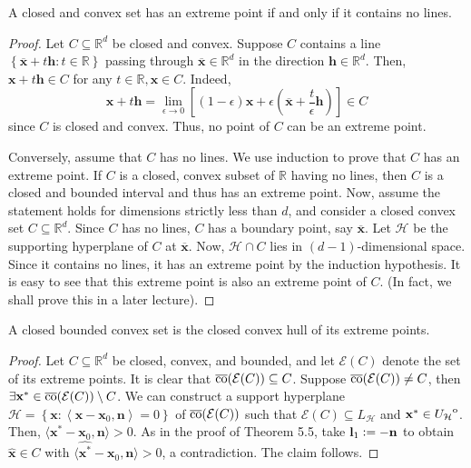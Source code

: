 \begin{thm}
    A closed and convex set has an extreme point if and only if it contains no lines. 
\end{thm}
\begin{proof}
    Let $C \subseteq \mathbb{R}^d$ be closed and convex. Suppose $C$ contains a line $\left\{ \overline{\mathbf{x}} + t\mathbf{h} \colon t \in \mathbb{R} \right\}$ passing through $\overline{\mathbf{x}} \in \mathbb{R}^d$ in the direction $\mathbf{h} \in \mathbb{R}^d$. Then, $\mathbf{x} + t\mathbf{h} \in C$ for any $t \in \mathbb{R}, \mathbf{x} \in C$. Indeed, 
    \[
        \mathbf{x} + t\mathbf{h} = \lim_{\epsilon \to 0} \left[ (1-\epsilon) \mathbf{x} + \epsilon \left( \overline{\mathbf{x}} + \frac{t}{\epsilon} \mathbf{h} \right) \right] \in C
    \]
    since $C$ is closed and convex. Thus, no point of $C$ can be an extreme point. 

    Conversely, assume that $C$ has no lines. We use induction to prove that $C$ has an extreme point. If $C$ is a closed, convex subset of $\mathbb{R}$ having no lines, then $C$ is a closed and bounded interval and thus has an extreme point. Now, assume the statement holds for dimensions strictly less than $d$, and consider a closed convex set $C \subseteq \mathbb{R}^d$. Since $C$ has no lines, $C$ has a boundary point, say $\overline{\mathbf{x}}$. Let $\mathcal{H}$ be the supporting hyperplane of $C$ at $\overline{\mathbf{x}}$. Now, $\mathcal{H} \cap C$ lies in $(d-1)$-dimensional space. Since it contains no lines, it has an extreme point by the induction hypothesis. It is easy to see that this extreme point is also an extreme point of $C$. (In fact, we shall prove this in a later lecture). 
\end{proof}

\begin{thm}
    A closed bounded convex set is the closed convex hull of its extreme points.
\end{thm}
\begin{proof}
    Let $C \subseteq \mathbb{R}^d$ be closed, convex, and bounded, and let $\mathcal{E}(C)$ denote the set of its extreme points. It is clear that $\operatorname*{\overline{co}}(\mathcal{E}(C)) \subseteq C$. Suppose $\operatorname*{\overline{co}}(\mathcal{E}(C)) \neq C$, then $\exists \mathbf{x}^* \in \operatorname*{\overline{co}}(\mathcal{E}(C)) \setminus C$. We can construct a support hyperplane $\mathcal{H} = \left\{ \mathbf{x} \colon \left\langle \mathbf{x} - \mathbf{x}_0, \mathbf{n} \right\rangle = 0 \right\}$ of $\operatorname*{\overline{co}}(\mathcal{E}(C))$ such that $\mathcal{E}(C) \subseteq L_{\mathcal{H}}$ and $\mathbf{x}^* \in {\kern0ptU_{\mathcal{H}}}^{\mathrm{o}}$. Then, $\langle \mathbf{x}^* - \mathbf{x}_0, \mathbf{n} \rangle > 0$. As in the proof of Theorem 5.5, take $\mathbf{l}_1 \vcentcolon= -\mathbf{n}$ to obtain $\hat{\mathbf{x}} \in C$ with $\langle \hat{\mathbf{x}^*} - \mathbf{x}_0, \mathbf{n} \rangle > 0$, a contradiction. The claim follows. 
\end{proof}